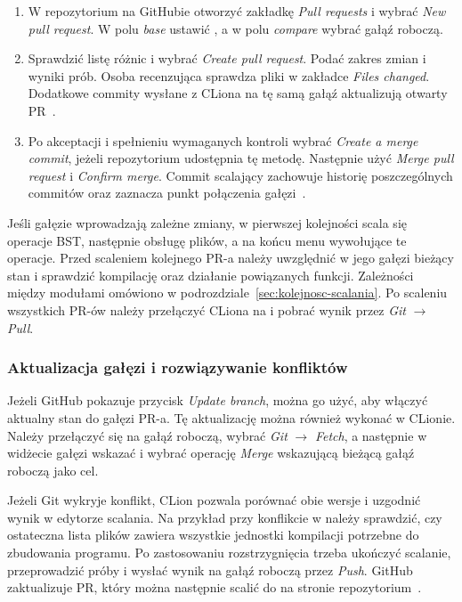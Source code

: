 \begin{enumerate}
  \item W repozytorium na GitHubie otworzyć zakładkę
        \emph{Pull requests} i wybrać \emph{New pull request}.
        W polu \emph{base} ustawić , a w polu
        \emph{compare} wybrać gałąź roboczą.
  \item Sprawdzić listę różnic i wybrać \emph{Create pull request}.
        Podać zakres zmian i wyniki prób. Osoba recenzująca
        sprawdza pliki w zakładce \emph{Files changed}.
        Dodatkowe commity wysłane z CLiona na tę samą gałąź
        aktualizują otwarty PR~\cite{github-flow}.
  \item Po akceptacji i spełnieniu wymaganych kontroli wybrać
        \emph{Create a merge commit}, jeżeli repozytorium
        udostępnia tę metodę. Następnie użyć
        \emph{Merge pull request} i \emph{Confirm merge}.
        Commit scalający zachowuje historię poszczególnych
        commitów oraz zaznacza punkt połączenia
        gałęzi~\cite{github-scalanie}.
\end{enumerate}

Jeśli gałęzie wprowadzają zależne zmiany, w pierwszej kolejności
scala się operacje BST, następnie obsługę plików, a na końcu menu
wywołujące te operacje. Przed scaleniem kolejnego PR-a należy
uwzględnić w jego gałęzi bieżący stan  i sprawdzić
kompilację oraz działanie powiązanych funkcji. Zależności między
modułami omówiono w podrozdziale~\ref{sec:kolejnosc-scalania}.
Po scaleniu wszystkich PR-ów należy przełączyć CLiona na
 i pobrać wynik przez \emph{Git} $\to$ \emph{Pull}.

\subsubsection{Aktualizacja gałęzi i rozwiązywanie konfliktów}
\label{sec:konflikt-scalania}

Jeżeli GitHub pokazuje przycisk \emph{Update branch}, można go
użyć, aby włączyć aktualny stan  do gałęzi PR-a.
Tę aktualizację można również wykonać w CLionie. Należy
przełączyć się na gałąź roboczą, wybrać \emph{Git} $\to$
\emph{Fetch}, a następnie w widżecie gałęzi wskazać
 i wybrać operację \emph{Merge} wskazującą
bieżącą gałąź roboczą jako cel.

Jeżeli Git wykryje konflikt, CLion pozwala porównać obie
wersje i uzgodnić wynik w edytorze scalania. Na przykład przy
konflikcie w  należy sprawdzić, czy ostateczna
lista plików zawiera wszystkie jednostki kompilacji potrzebne
do zbudowania programu. Po zastosowaniu rozstrzygnięcia trzeba
ukończyć scalanie, przeprowadzić próby i wysłać wynik na gałąź
roboczą przez \emph{Push}. GitHub zaktualizuje PR, który można
następnie scalić do  na stronie
repozytorium~\cite{github-konflikty}.

